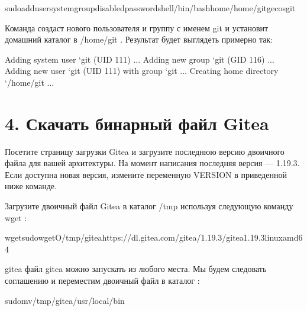 \documentclass[a4paper,10pt,russian]{report}
\begin{document}
\begin{sphinxVerbatim}[commandchars=\\\{\}]
\PYGZdl{}sudoadduser\PYGZhy{}\PYGZhy{}system\PYGZhy{}\PYGZhy{}group\PYGZhy{}\PYGZhy{}disabled\PYGZhy{}password\PYGZhy{}\PYGZhy{}shell/bin/bash\PYGZhy{}\PYGZhy{}home/home/git\PYGZhy{}\PYGZhy{}gecosgit
\end{sphinxVerbatim}

\sphinxAtStartPar
Команда создаст нового пользователя и группу с именем git и установит домашний каталог в /home/git . Результат будет выглядеть примерно так:

\begin{sphinxVerbatim}[commandchars=\\\{\}]
Adding system user `git\PYGZsq{} (UID 111) ...
Adding new group `git\PYGZsq{} (GID 116) ...
Adding new user `git\PYGZsq{} (UID 111) with group `git\PYGZsq{} ...
Creating home directory `/home/git\PYGZsq{} ...
\end{sphinxVerbatim}


\section{4. Скачать бинарный файл Gitea}
\label{\detokenize{git:id4}}
\sphinxAtStartPar
Посетите страницу загрузки Gitea и загрузите последнюю версию двоичного файла для вашей архитектуры.
На момент написания последняя версия — 1.19.3. Если доступна новая версия, измените переменную VERSION в приведенной ниже команде.

\sphinxAtStartPar
Загрузите двоичный файл Gitea в каталог /tmp используя следующую команду wget :

\begin{sphinxVerbatim}[commandchars=\\\{\}]
\PYGZdl{}wgetsudowget\PYGZhy{}O/tmp/giteahttps://dl.gitea.com/gitea/1.19.3/gitea\PYGZhy{}1.19.3\PYGZhy{}linux\PYGZhy{}amd64
\end{sphinxVerbatim}

\sphinxAtStartPar
gitea файл gitea можно запускать из любого места. Мы будем следовать соглашению и переместим двоичный файл в каталог  :

\begin{sphinxVerbatim}[commandchars=\\\{\}]
\PYGZdl{}sudomv/tmp/gitea/usr/local/bin
\end{sphinxVerbatim}
\end{document}
